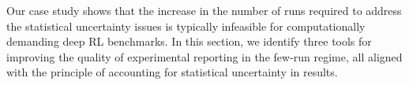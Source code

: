 







Our case study shows that the increase in the number of runs required to address the statistical uncertainty issues is typically infeasible for computationally demanding deep RL benchmarks.
In this section, we identify three tools for improving the quality of experimental reporting in the few-run regime, all aligned with the principle of accounting for statistical uncertainty in results.



